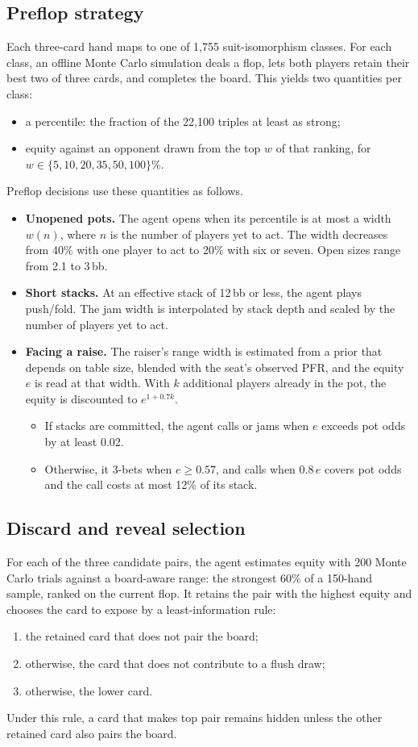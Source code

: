 \documentclass[10pt]{article}
\begin{document}
\subsection{Preflop strategy}
Each three-card hand maps to one of 1,755 suit-isomorphism classes. For each class, an offline Monte Carlo simulation deals a flop, lets both players retain their best two of three cards, and completes the board. This yields two quantities per class:
\begin{itemize}
\item a percentile: the fraction of the 22,100 triples at least as strong;
\item equity against an opponent drawn from the top $w$ of that ranking, for $w\in\{5,10,20,35,50,100\}\%$.
\end{itemize}
Preflop decisions use these quantities as follows.
\begin{itemize}
\item \textbf{Unopened pots.} The agent opens when its percentile is at most a width $w(n)$, where $n$ is the number of players yet to act. The width decreases from 40\% with one player to act to 20\% with six or seven. Open sizes range from 2.1 to 3\,bb.
\item \textbf{Short stacks.} At an effective stack of 12\,bb or less, the agent plays push/fold. The jam width is interpolated by stack depth and scaled by the number of players yet to act.
\item \textbf{Facing a raise.} The raiser's range width is estimated from a prior that depends on table size, blended with the seat's observed PFR, and the equity $e$ is read at that width. With $k$ additional players already in the pot, the equity is discounted to $e^{1+0.7k}$.
  \begin{itemize}
  \item If stacks are committed, the agent calls or jams when $e$ exceeds pot odds by at least 0.02.
  \item Otherwise, it 3-bets when $e\ge0.57$, and calls when $0.8\,e$ covers pot odds and the call costs at most 12\% of its stack.
  \end{itemize}
\end{itemize}

\subsection{Discard and reveal selection}
For each of the three candidate pairs, the agent estimates equity with 200 Monte Carlo trials against a board-aware range: the strongest 60\% of a 150-hand sample, ranked on the current flop. It retains the pair with the highest equity and chooses the card to expose by a least-information rule:
\begin{enumerate}
\item the retained card that does not pair the board;
\item otherwise, the card that does not contribute to a flush draw;
\item otherwise, the lower card.
\end{enumerate}
Under this rule, a card that makes top pair remains hidden unless the other retained card also pairs the board.
\end{document}

